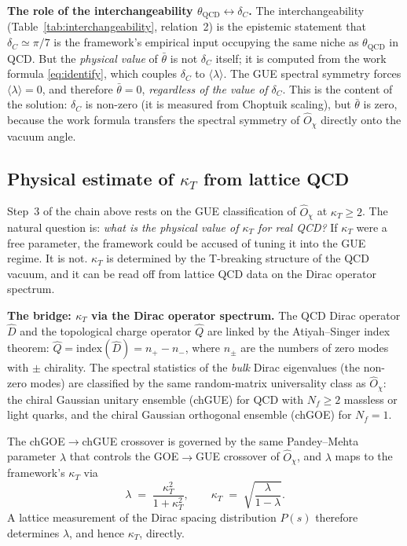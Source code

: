 \documentclass[11pt,a4paper]{article}
\newcommand{\dC}{\delta_C}
\newcommand{\Opchi}{\hat{O}_\chi}
\theoremstyle{plain}
\theoremstyle{definition}
\theoremstyle{remark}
\begin{document}
\medskip\noindent
\textbf{The role of the interchangeability
$\theta_{\mathrm{QCD}} \leftrightarrow \dC$.}
The interchangeability (Table~\ref{tab:interchangeability},
relation~2) is the epistemic statement that $\dC \simeq \pi/7$ is the
framework's empirical input occupying the same niche as
$\theta_{\mathrm{QCD}}$ in QCD.  But the \emph{physical value} of
$\bar\theta$ is not $\dC$ itself; it is computed from the work formula
\eqref{eq:identify}, which couples $\dC$ to
$\langle\lambda\rangle$.  The GUE spectral symmetry forces
$\langle\lambda\rangle = 0$, and therefore $\bar\theta = 0$,
\emph{regardless of the value of $\dC$}.  This is the content of the
solution: $\dC$ is non-zero (it is measured from Choptuik scaling),
but $\bar\theta$ is zero, because the work formula transfers the
spectral symmetry of $\Opchi$ directly onto the vacuum angle.

\subsection{Physical estimate of $\kappa_T$ from lattice QCD}
\label{ssec:kappa-T-physical}

Step~3 of the chain above rests on the GUE classification of $\Opchi$
at $\kappa_T \ge 2$.  The natural question is: \emph{what is the
physical value of $\kappa_T$ for real QCD?}  If $\kappa_T$ were a
free parameter, the framework could be accused of tuning it into the
GUE regime.  It is not.  $\kappa_T$ is determined by the
T-breaking structure of the QCD vacuum, and it can be read off from
lattice QCD data on the Dirac operator spectrum.

\medskip\noindent
\textbf{The bridge: $\kappa_T$ via the Dirac operator spectrum.}
The QCD Dirac operator $\hat D$ and the topological charge operator
$\hat Q$ are linked by the Atiyah--Singer index theorem:
$\hat Q = \mathrm{index}(\hat D) = n_+ - n_-$, where $n_\pm$ are the
numbers of zero modes with $\pm$ chirality.  The spectral statistics
of the \emph{bulk} Dirac eigenvalues (the non-zero modes) are
classified by the same random-matrix universality class as $\Opchi$:
the chiral Gaussian unitary ensemble (chGUE) for QCD with
$N_f \ge 2$ massless or light quarks, and the chiral Gaussian
orthogonal ensemble (chGOE) for $N_f = 1$.

The chGOE$\to$chGUE crossover is governed by the same Pandey--Mehta
parameter $\lambda$ that controls the GOE$\to$GUE crossover of
$\Opchi$, and $\lambda$ maps to the framework's $\kappa_T$ via
\begin{equation}\label{eq:pandey-mehta}
  \lambda \;=\; \frac{\kappa_T^2}{1 + \kappa_T^2},
  \qquad
  \kappa_T \;=\; \sqrt{\frac{\lambda}{1 - \lambda}}.
\end{equation}
A lattice measurement of the Dirac spacing distribution $P(s)$
therefore determines $\lambda$, and hence $\kappa_T$, directly.
\end{document}
